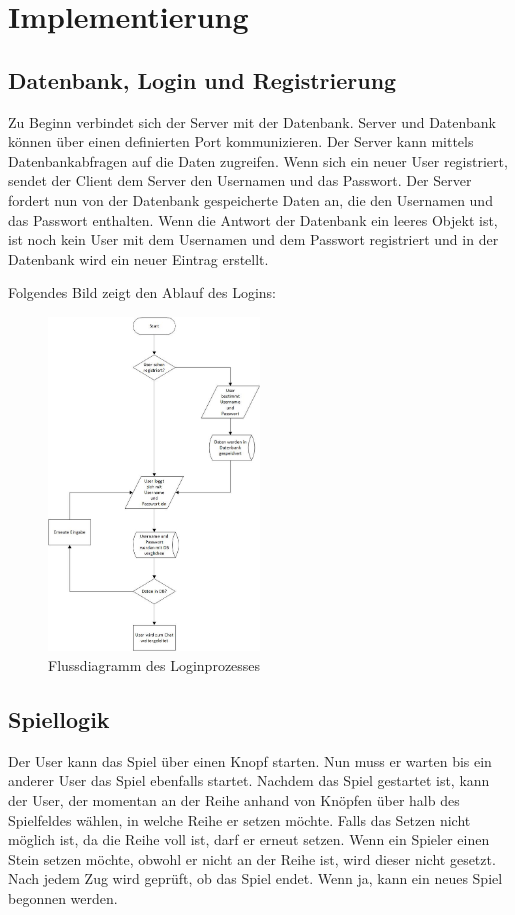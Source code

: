 
\chapter{Implementierung}\label{cha:Implementierung}
\section{Datenbank, Login und Registrierung}\label{Datenbank}
Zu Beginn verbindet sich der Server mit der Datenbank. Server und Datenbank können über einen definierten Port kommunizieren. Der Server kann mittels Datenbankabfragen auf die Daten zugreifen. Wenn sich ein neuer User registriert, sendet der Client dem Server den Usernamen und das Passwort. Der Server fordert nun von der Datenbank gespeicherte Daten an, die den Usernamen und das Passwort enthalten. Wenn die Antwort der Datenbank ein leeres Objekt ist, ist noch kein User mit dem Usernamen und dem Passwort registriert und in der Datenbank wird ein neuer Eintrag erstellt. 

Folgendes Bild zeigt den Ablauf des Logins:
\begin{figure}[H]
\centering
\includegraphics[width=0.5\textwidth]{images/login.jpg}
\caption{Flussdiagramm des Loginprozesses}
\end{figure}


\section{Spiellogik}\label{sec:Spiellogik}
Der User kann das Spiel über einen Knopf starten. Nun muss er warten bis ein anderer User das Spiel ebenfalls startet. Nachdem das Spiel gestartet ist, kann der User, der momentan an der Reihe anhand von Knöpfen über halb des Spielfeldes wählen, in welche Reihe er setzen möchte. Falls das Setzen nicht möglich ist, da die Reihe voll ist, darf er erneut setzen. Wenn ein Spieler einen Stein setzen möchte, obwohl er nicht an der Reihe ist, wird dieser nicht gesetzt. Nach jedem Zug wird geprüft, ob das Spiel endet. Wenn ja, kann ein neues Spiel begonnen werden.

